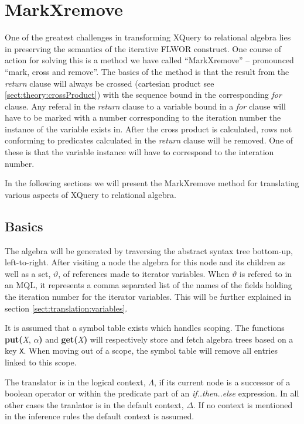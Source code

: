 \section{MarkXremove}
\label{sect:translation:markXremove}

One of the greatest challenges in transforming XQuery to relational algebra
lies in preserving the semantics of the iterative FLWOR construct. One
course of action for solving this is a method we have called ``MarkXremove'' --
pronounced ``mark, cross and remove''. The basics of the method is that the
result from the \textit{return} clause will always be crossed (cartesian product
see \ref{sect:theory:crossProduct}) with the sequence bound in the
corresponding \textit{for} clause. Any referal in the \textit{return} clause to a
variable bound in a \textit{for} clause will have to be marked with a number
corresponding to the iteration number the instance of the variable exists in.
After the cross product is calculated, rows not conforming to predicates
calculated in the \textit{return} clause will be removed. One of these is that
the variable instance will have to correspond to the interation number.

In the following sections we will present the MarkXremove method for
translating various aspects of XQuery to relational algebra.

\subsection{Basics}
The algebra will be generated by traversing the abstract syntax tree bottom-up,
left-to-right. After visiting a node the algebra for this node and its children
as well as a set, $\vartheta$, of references made to iterator variables. When
$\vartheta$ is refered to in an MQL, it represents a comma separated list of
the names of the fields holding the iteration number for the iterator
variables. This will be further explained in section
\ref{sect:translation:variables}.

It is assumed that a symbol table exists which handles scoping. The functions
\textbf{put(}\textit{X}, $\alpha$\textbf{)} and \textbf{get(}\textit{X}\textbf{)}
will respectively store and fetch algebra trees based on a key \verb!X!. When
moving out of a scope, the symbol table will remove all entries linked to this scope.

The translator is in the logical context, $\Lambda$, if its current node is a
successor of a boolean operator or within the predicate part of an
\textit{if..then..else} expression. In all other cases the tranlator is in the
default context, $\Delta$. If no context is mentioned in the inference rules
the default context is assumed.

